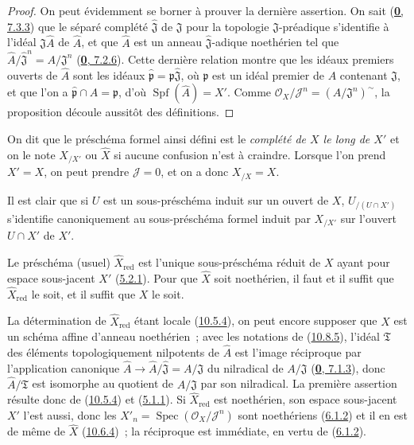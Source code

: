 \begin{proof}
On peut évidemment se borner à prouver la dernière assertion. On sait
(\hyperref[0.7.3.3-fr]{\textbf{0}, 7.3.3}) que le séparé complété
$\widehat{\mathfrak{J}}$ de $\mathfrak{J}$ pour la topologie
$\mathfrak{J}$-préadique s'identifie à l'idéal
$\mathfrak{J}\widehat A$ de $\widehat A$, et que $\widehat A$ est un anneau
$\widehat{\mathfrak{J}}$-adique noethérien tel que
$\widehat A/\widehat{\mathfrak{J}}^n=A/\mathfrak{J}^n$
(\hyperref[0.7.2.6-fr]{\textbf{0}, 7.2.6}). Cette dernière relation montre que les
idéaux premiers ouverts de $\widehat A$ sont les idéaux
$\widehat{\mathfrak p}=\mathfrak p\widehat{\mathfrak{J}}$, où $\mathfrak p$ est un
idéal premier de $A$ contenant $\mathfrak{J}$, et que l'on a
$\widehat{\mathfrak p}\cap A=\mathfrak p$, d'où
$\operatorname{Spf}(\widehat A)=X'$. Comme
$\mathscr{O}_X/\mathscr{J}^n=(A/\mathfrak{J}^n)^{\sim}$, la proposition
découle aussitôt des définitions.
\end{proof}

On dit que le préschéma formel ainsi défini est le
\emph{complété de $X$ le long de $X'$} et on le note $X_{/X'}$ ou
$\widehat X$ si aucune confusion n'est à craindre. Lorsque l'on prend
$X'=X$, on peut prendre $\mathscr{J}=0$, et on a donc $X_{/X}=X$.

Il est clair que si $U$ est un sous-préschéma induit sur un ouvert de $X$,
$U_{/(U\cap X')}$ s'identifie canoniquement au sous-préschéma formel induit
par $X_{/X'}$ sur l'ouvert $U\cap X'$ de $X'$.

\begin{corollary}[10.8.6]
\label{I.10.8.6-fr}
Le préschéma (usuel) $\widehat X_{\mathrm{red}}$ est l'unique
sous-préschéma réduit de $X$ ayant pour espace sous-jacent $X'$
\textup{(\hyperref[I.5.2.1-fr]{5.2.1})}. Pour que $\widehat X$ soit noethérien, il
faut et il suffit que $\widehat X_{\mathrm{red}}$ le soit, et il suffit que
$X$ le soit.
\end{corollary}


La détermination de $\widehat X_{\mathrm{red}}$ étant locale
(\hyperref[I.10.5.4-fr]{10.5.4}), on peut encore supposer que $X$ est un
schéma affine d'anneau noethérien~; avec les notations de
(\hyperref[I.10.8.5-fr]{10.8.5}), l'idéal $\mathfrak{T}$ des éléments
topologiquement nilpotents de $\widehat A$ est l'image réciproque par
l'application canonique
$\widehat A\to\widehat A/\widehat{\mathfrak{J}}=A/\mathfrak{J}$ du
nilradical de $A/\mathfrak{J}$
(\hyperref[0.7.1.3-fr]{\textbf{0}, 7.1.3}), donc $\widehat A/\mathfrak{T}$ est
isomorphe au quotient de $A/\mathfrak{J}$ par son nilradical. La première
assertion résulte donc de (\hyperref[I.10.5.4-fr]{10.5.4}) et
(\hyperref[I.5.1.1-fr]{5.1.1}). Si $\widehat X_{\mathrm{red}}$ est
noethérien, son espace sous-jacent $X'$ l'est aussi, donc les
$X'_n=\operatorname{Spec}(\mathscr{O}_X/\mathscr{J}^n)$ sont noethériens
(\hyperref[I.6.1.2-fr]{6.1.2}) et il en est de même de $\widehat X$
(\hyperref[I.10.6.4-fr]{10.6.4})~; la réciproque est immédiate, en vertu
de (\hyperref[I.6.1.2-fr]{6.1.2}).

